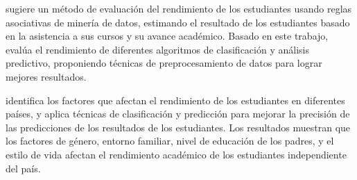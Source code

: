 



\textcite{borkar2013predicting} sugiere un método de evaluación del rendimiento de los estudiantes usando reglas asociativas de minería de datos, estimando el resultado de los estudiantes basado en la asistencia a sus cursos y su avance académico. Basado en este trabajo, \textcite{shazmeen2013performance} evalúa el rendimiento de diferentes algoritmos de clasificación y análisis predictivo, proponiendo técnicas de preprocesamiento de datos para lograr mejores resultados.

\textcite{oskouei2014predicting} identifica los factores que afectan el rendimiento de los estudiantes en diferentes países, y aplica técnicas de clasificación y predicción para mejorar la precisión de las predicciones de los resultados de los estudiantes. Los resultados muestran que los factores de género, entorno familiar, nivel de educación de los padres, y el estilo de vida afectan el rendimiento académico de los estudiantes independiente del país.







